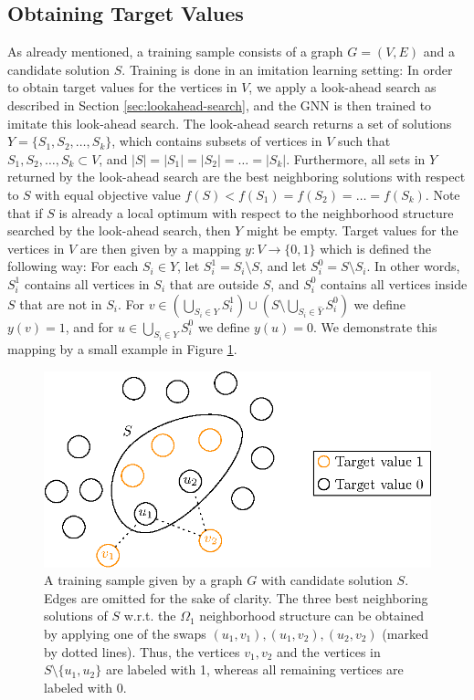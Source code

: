 \documentclass[draft,final]{vutinfth} %
\begin{document}
\subsection{Obtaining Target Values}\label{subsec:target-values}
As already mentioned, a training sample consists of a graph $G = (V,E)$ and a candidate solution $S$. Training is done in an imitation learning setting: In order to obtain target values for the vertices in $V$, we apply a look-ahead search as described in Section \ref{sec:lookahead-search}, and the GNN is then trained to imitate this look-ahead search. 
The look-ahead search returns a set of solutions $Y = \{S_1, S_2, \dots, S_k\}$, which contains subsets of vertices in $V$ such that $S_1, S_2, \dots, S_k \subset V$, and $|S| = |S_1| = |S_2| = \dots = |S_k|$. Furthermore, all sets in $Y$ returned by the look-ahead search are the best neighboring solutions with respect to $S$ with equal objective value $f(S) < f(S_1) = f(S_2) = \dots = f(S_k)$. Note that if $S$ is already a local optimum with respect to the neighborhood structure searched by the look-ahead search, then $Y$ might be empty. Target values for the vertices in $V$ are then given by a mapping $y \colon V \rightarrow \{0,1\}$ which is defined the following way: For each $S_i \in Y$, let $S_{i}^1 = S_i \setminus S$, and let $S_{i}^0 = S \setminus S_i$. In other words, $S_i^1$ contains all vertices in $S_i$ that are outside $S$, and $S_i^0$ contains all vertices inside $S$ that are not in $S_i$. For $v \in (\bigcup_{S_i \in Y} S_i^1) \cup (S \setminus \bigcup_{S_i \in \hat{Y}} S_i^0)$ we define $y(v) = 1$, and for $u \in \bigcup_{S_i \in Y} S_i^0$ we define $y(u) = 0 $. We demonstrate this mapping by a small example in Figure \ref{fig:target-values}. 

\begin{figure}
    \centering
    \includegraphics[width=\textwidth]{graphics/target_values.eps}
    \caption[]{A training sample given by a graph $G$ with candidate solution $S$. Edges are omitted for the sake of clarity. The three best neighboring solutions of $S$ w.r.t. the $\Omega_1$ neighborhood structure can be obtained by applying one of the swaps $(u_1, v_1), (u_1, v_2), (u_2, v_2)$ (marked by dotted lines). Thus, the vertices $v_1, v_2$ and the vertices in $S \setminus \{u_1, u_2\}$ are labeled with 1, whereas all remaining vertices are labeled with 0. }
    \label{fig:target-values}
\end{figure}
\end{document}
